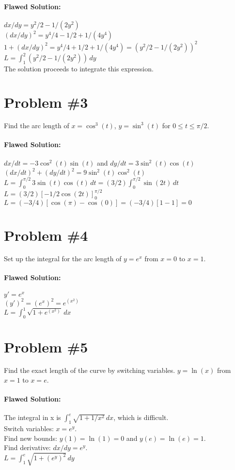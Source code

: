 \documentclass{article}
\begin{document}
\paragraph{Flawed Solution:}
$dx/dy = y^2/2 - 1/(2y^2)$ \\
$(dx/dy)^2 = y^4/4 - 1/2 + 1/(4y^4)$ \\
$1 + (dx/dy)^2 = y^4/4 + 1/2 + 1/(4y^4) = (y^2/2 - 1/(2y^2))^2$ \\
$L = \int_{1}^{2} (y^2/2 - 1/(2y^2)) \,dy$ \\
The solution proceeds to integrate this expression.

\section*{Problem \#3}
Find the arc length of $x = \cos^3(t)$, $y = \sin^3(t)$ for $0 \le t \le \pi/2$.
\paragraph{Flawed Solution:}
$dx/dt = -3\cos^2(t)\sin(t)$ and $dy/dt = 3\sin^2(t)\cos(t)$ \\
$(dx/dt)^2 + (dy/dt)^2 = 9\sin^2(t)\cos^2(t)$ \\
$L = \int_{0}^{\pi/2} 3\sin(t)\cos(t) \,dt = (3/2) \int_{0}^{\pi/2} \sin(2t) \,dt$ \\
$L = (3/2) [-1/2 \cos(2t)]_{0}^{\pi/2}$ \\
$L = (-3/4) [\cos(\pi) - \cos(0)] = (-3/4)[1 - 1] = 0$

\section*{Problem \#4}
Set up the integral for the arc length of $y = e^x$ from $x = 0$ to $x = 1$.
\paragraph{Flawed Solution:}
$y' = e^x$ \\
$(y')^2 = (e^x)^2 = e^{(x^2)}$ \\
$L = \int_{0}^{1} \sqrt{1 + e^{(x^2)}} \,dx$

\section*{Problem \#5}
Find the exact length of the curve by switching variables. $y = \ln(x)$ from $x = 1$ to $x = e$.
\paragraph{Flawed Solution:}
The integral in x is $\int_{1}^{e} \sqrt{1 + 1/x^2} \,dx$, which is difficult. \\
Switch variables: $x = e^y$. \\
Find new bounds: $y(1) = \ln(1) = 0$ and $y(e) = \ln(e) = 1$. \\
Find derivative: $dx/dy = e^y$. \\
$L = \int_{1}^{e} \sqrt{1 + (e^y)^2} \,dy$
\end{document}
